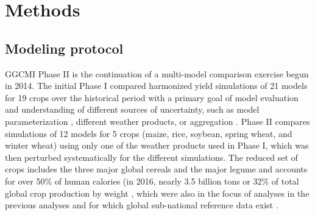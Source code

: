 \documentclass[gmd, manuscript]{copernicus} %
\begin{document}
\section{Methods}
\label{S:2}

\subsection{Modeling protocol}

GGCMI Phase II is the continuation of a multi-model comparison exercise begun in 2014. 
The initial Phase I compared harmonized yield simulations of 21 models for 19 crops over the historical period with a primary goal of model evaluation \citep{Elliott2015, muller_global_2017} and understanding of different sources of uncertainty, such as model parameterization \citep{folberth2016}, different weather products, or aggregation \citep{porwollik_spatial_2016}. 
Phase II compares simulations of 12 models for 5 crops (maize, rice, soybean, spring wheat, and winter wheat) using only one of the weather products used in Phase I, which was then perturbed systematically for the different simulations. 
The reduced set of crops includes the three major global cereals and the major legume and accounts for over 50\% of human calories (in 2016, nearly 3.5 billion tons or 32\% of total global crop production by weight \citep{FAOSTAT}, which were also in the focus of analyses in the previous analyses \citep{Elliott2015,muller_global_2017,porwollik_spatial_2016} and for which global sub-national reference data exist \citep{Ray2012,iizumi_historical_2014}. 
\end{document}
